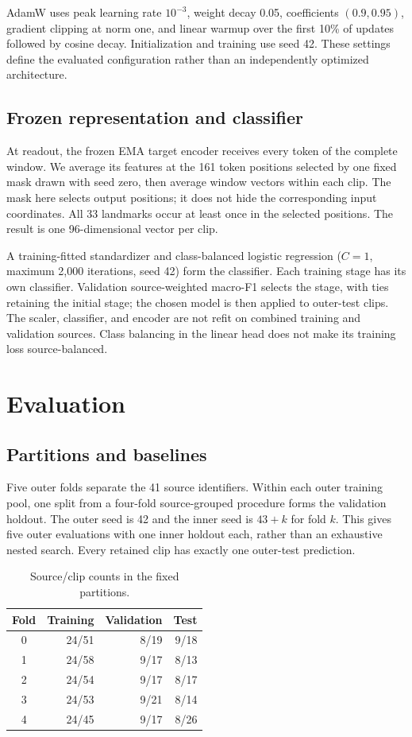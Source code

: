 \documentclass[10pt,twocolumn,letterpaper]{article}
\begin{document}
AdamW uses peak learning rate $10^{-3}$, weight decay 0.05, coefficients $(0.9,0.95)$, gradient clipping at norm one, and linear warmup over the first 10\% of updates followed by cosine decay. Initialization and training use seed 42. These settings define the evaluated configuration rather than an independently optimized architecture.

\subsection{Frozen representation and classifier}
At readout, the frozen EMA target encoder receives every token of the complete window. We average its features at the 161 token positions selected by one fixed mask drawn with seed zero, then average window vectors within each clip. The mask here selects output positions; it does not hide the corresponding input coordinates. All 33 landmarks occur at least once in the selected positions. The result is one 96-dimensional vector per clip.

A training-fitted standardizer and class-balanced logistic regression ($C=1$, maximum 2,000 iterations, seed 42) form the classifier. Each training stage has its own classifier. Validation source-weighted macro-F1 selects the stage, with ties retaining the initial stage; the chosen model is then applied to outer-test clips. The scaler, classifier, and encoder are not refit on combined training and validation sources. Class balancing in the linear head does not make its training loss source-balanced.

\section{Evaluation}
\subsection{Partitions and baselines}
Five outer folds separate the 41 source identifiers. Within each outer training pool, one split from a four-fold source-grouped procedure forms the validation holdout. The outer seed is 42 and the inner seed is $43+k$ for fold $k$. This gives five outer evaluations with one inner holdout each, rather than an exhaustive nested search. Every retained clip has exactly one outer-test prediction.

\begin{table}[t]
\centering
\caption{Source/clip counts in the fixed partitions.}
\label{tab:splits}
\begin{tabular}{crrr}
\toprule
Fold & Training & Validation & Test\\
\midrule
0&24/51&8/19&9/18\\
1&24/58&9/17&8/13\\
2&24/54&9/17&8/17\\
3&24/53&9/21&8/14\\
4&24/45&9/17&8/26\\
\bottomrule
\end{tabular}
\end{table}
\end{document}
